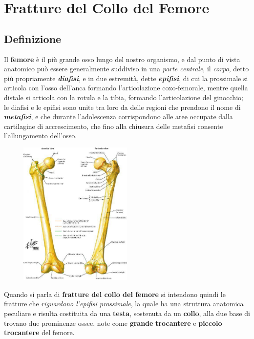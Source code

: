 

\section{Fratture del Collo del Femore}

\subsection{Definizione}

Il \textbf{femore} è il più grande osso lungo del nostro organismo, e
dal punto di vista anatomico può essere generalmente suddiviso in una
\emph{parte centrale}, il \emph{corpo}, detto più propriamente
\textbf{\emph{diafisi}}, e in due estremità, dette
\textbf{\emph{epifisi}}, di cui la prossimale si articola con l'osso
dell'anca formando l'articolazione coxo-femorale, mentre quella distale
si articola con la rotula e la tibia, formando l'articolazione del
ginocchio; le diafisi e le epifisi sono unite tra loro da delle regioni
che prendono il nome di \textbf{\emph{metafisi}}, e che durante
l'adolescenza corrispondono alle aree occupate dalla cartilagine di
accrescimento, che fino alla chiusura delle metafisi consente
l'allungamento dell'osso.
\begin{figure}[!ht]
\centering
	\includegraphics[width=0.5\textwidth]{007/image1.jpeg}
\end{figure}
Quando si parla di \textbf{fratture del collo del femore} si intendono
quindi le fratture che \emph{riguardano l'epifisi prossimale}, la quale
ha una struttura anatomica peculiare e risulta costituita da una
\textbf{testa}, sostenuta da un \textbf{collo}, alla due base di trovano
due prominenze ossee, note come \textbf{grande} \textbf{trocantere} e
\textbf{piccolo} \textbf{trocantere} del femore.

